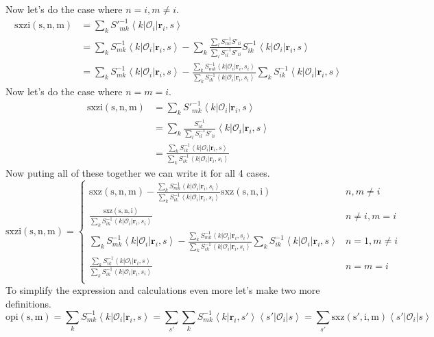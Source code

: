 \documentclass[12pt]{extarticle}
\newcommand{\Oi}{\mathcal{O}_{i}}
\newcommand{\ket}[1]{\left| #1 \right>}
\newcommand{\bra}[1]{\left< #1 \right|}
\newcommand{\braket}[2]{\left< #1 | #2 \right>}
\begin{document}
Now let's do the case where $n=i,m\neq i$.
\begin{align}
  \mathrm{sxzi(s,n,m)} &= \sum_k S'^{-1}_{mk}\bra{k}\Oi\ket{\mathbf{r}_i,s} \\
  &= \sum_kS^{-1}_{mk}\bra{k}\Oi\ket{\mathbf{r}_i,s} - \sum_k \frac{\sum_l S^{-1}_{ml} S'_{li}}{\sum_l S^{-1}_{il} S'_{li}} S^{-1}_{ik}\bra{k}\Oi\ket{\mathbf{r}_i,s} \\
  &= \sum_kS^{-1}_{mk}\bra{k}\Oi\ket{\mathbf{r}_i,s} - \frac{\sum_k S^{-1}_{mk} \bra{k}\Oi\ket{\mathbf{r}_i,s_i}}{\sum_k S^{-1}_{ik} \bra{k}\Oi\ket{\mathbf{r}_i,s_i}} \sum_k S^{-1}_{ik}\bra{k}\Oi\ket{\mathbf{r}_i,s}
\end{align}
Now let's do the case where $n=m=i$.
\begin{align}
  \mathrm{sxzi(s,n,m)} &= \sum_k S'^{-1}_{mk}\bra{k}\Oi\ket{\mathbf{r}_i,s} \\
  &= \sum_k \frac{S^{-1}_{ik}}{\sum_l S^{-1}_{il}S'_{li}} \bra{k}\Oi\ket{\mathbf{r}_i,s} \\
  &= \frac{\sum_k S^{-1}_{ik}\bra{k}\Oi\ket{\mathbf{r}_i,s}}{\sum_k S^{-1}_{ik} \bra{k}\Oi\ket{\mathbf{r}_i,s_i}}
\end{align}
Now puting all of these together we can write it for all 4 cases.
\begin{equation}
  \mathrm{sxzi(s,n,m)} = \begin{cases}
  \mathrm{sxz(s,n,m)} - \frac{\sum_k S^{-1}_{mk}\bra{k}\Oi\ket{\mathbf{r}_i,s_i}}{\sum_k S^{-1}_{ik}\bra{k}\Oi\ket{\mathbf{r}_i,s_i}} \mathrm{sxz(s,n,i)} & n,m \neq i \\
  \frac{\mathrm{sxz(s,n,i)}}{\sum_k S^{-1}_{ik} \bra{k}\Oi\ket{\mathbf{r}_i,s_i}} & n \neq i,m = i \\
  \sum_kS^{-1}_{mk}\bra{k}\Oi\ket{\mathbf{r}_i,s} - \frac{\sum_k S^{-1}_{mk} \bra{k}\Oi\ket{\mathbf{r}_i,s_i}}{\sum_k S^{-1}_{ik} \bra{k}\Oi\ket{\mathbf{r}_i,s_i}} \sum_k S^{-1}_{ik}\bra{k}\Oi\ket{\mathbf{r}_i,s} & n=1, m \neq i \\
  \frac{\sum_k S^{-1}_{ik}\bra{k}\Oi\ket{\mathbf{r}_i,s}}{\sum_k S^{-1}_{ik} \bra{k}\Oi\ket{\mathbf{r}_i,s_i}} & n=m=i \\
  \end{cases}
\end{equation}
To simplify the expression and calculations even more let's make two more definitions.
\begin{equation}
  \mathrm{opi(s,m)} = \sum_k S^{-1}_{mk}\bra{k}\Oi\ket{\mathbf{r}_i,s} = \sum_{s'}\sum_k S^{-1}_{mk} \braket{k}{\mathbf{r}_i,s'}\bra{s'}\Oi\ket{s} = \sum_{s'} \mathrm{sxz(s',i,m)}\bra{s'}\Oi\ket{s}
\end{equation}
\end{document}
